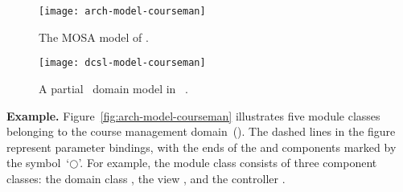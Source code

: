 
\begin{figure}[th]
	\centering
	\begin{minipage}[b]{0.4\textwidth}
		\texttt{[image: arch-model-courseman]}
		\caption{The MOSA model of \courseman.}
	\vspace{-0.4cm}
		\label{fig:arch-model-courseman}
	\end{minipage}
	\hspace{0.5em}
	\begin{minipage}[b]{0.56\textwidth}
		\texttt{[image: dcsl-model-courseman]}
		\caption{A partial \courseman~domain model in \dcsl~\cite{le_domain_2018}.}
	\vspace{-0.4cm}		
		\label{fig:dcsl_courseman}
	\end{minipage}
\end{figure}

%
\noindent \textbf{Example.} %
Figure~\ref{fig:arch-model-courseman} illustrates five module classes belonging to the course management domain~(\courseman). The dashed lines in the figure represent parameter bindings, with the ends of the  and  components marked by the symbol~`$\bigcirc$'. For example, the module class  consists of three component classes: the domain class , the view , and the controller .

